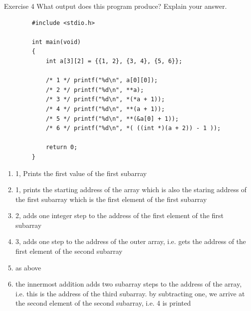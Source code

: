 \documentclass[10pt]{beamer}
\begin{document}
\begin{frame}{Exercise 4}
    What output does this program produce?
	Explain your answer.

	\begin{verbatim}
        #include <stdio.h>
        
        int main(void)
        {
            int a[3][2] = {{1, 2}, {3, 4}, {5, 6}};
            
            /* 1 */ printf("%d\n", a[0][0]);
            /* 2 */ printf("%d\n", **a);
            /* 3 */ printf("%d\n", *(*a + 1));
            /* 4 */ printf("%d\n", **(a + 1));
            /* 5 */ printf("%d\n", **(&a[0] + 1));
            /* 6 */ printf("%d\n", *( ((int *)(a + 2)) - 1 ));
            
            return 0;
        }
	\end{verbatim}
	    \begin{enumerate}
        \item 1, Prints the first value of the first subarray
        \item 1, prints the starting address of the array which is also the staring address of the first subarray which is the first element of the first subarray
        \item 2, adds one integer step to the address of the first element of the first subarray
        \item 3, adds one step to the address of the outer array, i.e. gets the address of the first element of the second subarray
        \item as above
        \item the innermost addition adds two subarray steps to the address of the array, i.e. this is the address of the third subarray. by subtracting one, we arrive at the second element of the second subarray, i.e. 4 is printed
    \end{enumerate}
\end{frame}
\end{document}
